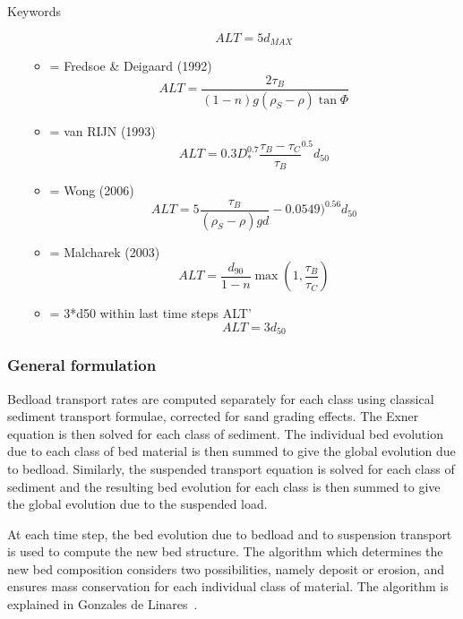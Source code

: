 \begin{bclogo}[couleur=blue!10,arrondi=0.1, logo=\bcinfo]{Keywords}
\begin{itemize}
\begin{itemize}
\begin{equation*}
          ALT = 5 d_{MAX}
       \end{equation*}          
\item {} = Fredsoe \& Deigaard (1992)
       \begin{equation*}
        ALT =\frac{2 \tau_B}{(1-n) g (\rho_S - \rho) \tan \Phi} 
       \end{equation*}
\item {} = van RIJN (1993)
       \begin{equation*}
        ALT =0.3 D_*^{0.7}\frac{\tau_B-\tau_C}{\tau_B}^{0.5} d_{50} 
       \end{equation*}
\item {} = Wong (2006)
       \begin{equation*}
        ALT =5 \frac{\tau_B}{(\rho_S - \rho) g d} - 0.0549)^{0.56} d_{50} 
       \end{equation*}
\item {} = Malcharek (2003)
       \begin{equation*}
        ALT =\frac{d_{90}}{1-n} \max(1,\frac{\tau_B}{\tau_C}) 
       \end{equation*}
\item { = 3*d50} within last time steps ALT'
       \begin{equation*}
        ALT =3 d_{50} 
       \end{equation*}
\end{itemize}
\end{itemize}
\end{bclogo}

\subsubsection{General formulation}
Bedload transport rates are computed separately for each class using
classical sediment transport formulae, corrected for sand grading effects. 
The Exner equation is then solved for each class of sediment. The
individual bed evolution due to each class of bed material is then summed
to give the global evolution due to bedload. Similarly, the suspended transport equation is solved for each class of
sediment and the resulting bed evolution for each class is then summed to give
the global evolution due to the suspended load. 

At each time step, the bed evolution due to bedload and to suspension transport is
used to compute the new bed structure. The algorithm which determines the new bed
composition considers two possibilities, namely deposit or erosion, and ensures
mass conservation for each individual class of material. The algorithm is
explained in Gonzales de Linares~\cite{Gonzales}.


